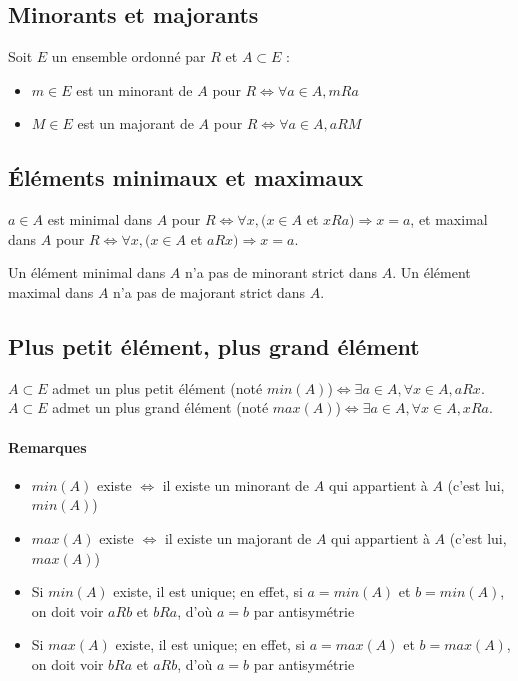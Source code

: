 \documentclass[11pt]{article}
\begin{document}
        \subsection{Minorants et majorants}
        Soit $E$ un ensemble ordonné par $R$ et $A\subset E$ :
            \begin{itemize}
                \item $m\in E$ est un minorant de $A$ pour $R\Leftrightarrow\forall a\in A,mRa$
                \item $M\in E$ est un majorant de $A$ pour $R\Leftrightarrow\forall a\in A, aRM$
            \end{itemize}

        \subsection{Éléments minimaux et maximaux}
            $a\in A$ est minimal dans $A$ pour $R\Leftrightarrow\forall x,(x\in A$ et $xRa)\Rightarrow x=a$, et maximal dans $A$ pour $R\Leftrightarrow\forall x,(x\in A$ et $aRx)\Rightarrow x=a$.

            Un élément minimal dans $A$ n'a pas de minorant strict dans $A$. Un élément maximal dans $A$ n'a pas de majorant strict dans $A$.

        \subsection{Plus petit élément, plus grand élément}
            $A\subset E$ admet un plus petit élément (noté $min(A)$)$\Leftrightarrow\exists a\in A,\forall x\in A, aRx$. $A\subset E$ admet un plus grand élément (noté $max(A)$)$\Leftrightarrow\exists a\in A,\forall x\in A, xRa$.

            \paragraph{Remarques}
                \begin{itemize}
                    \item $min(A)$ existe $\Leftrightarrow$ il existe un minorant de $A$ qui appartient à $A$ (c'est lui, $min(A)$)
                    \item $max(A)$ existe $\Leftrightarrow$ il existe un majorant de $A$ qui appartient à $A$ (c'est lui, $max(A)$)
                    \item Si $min(A)$ existe, il est unique; en effet, si $a=min(A)$ et $b=min(A)$, on doit voir $aRb$ et $bRa$, d'où $a=b$ par antisymétrie
                    \item Si $max(A)$ existe, il est unique; en effet, si $a=max(A)$ et $b=max(A)$, on doit voir $bRa$ et $aRb$, d'où $a=b$ par antisymétrie
                \end{itemize}
\end{document}
